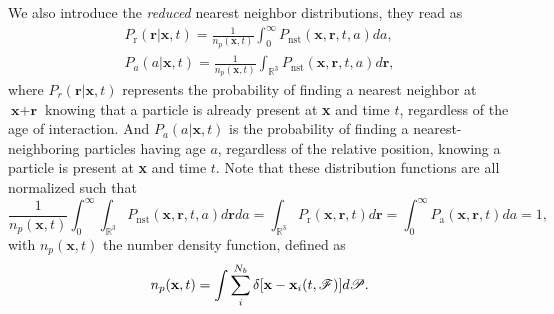 We also introduce the \textit{reduced} nearest neighbor distributions, they read as
\begin{align}
    P_\text{r}(\textbf{r}|\textbf{x},t)
    =\frac{1}{n_p(\textbf{x},t)}\int_0^\infty P_\text{nst}(\textbf{x},\textbf{r},t,a) da,\\
    P_a(a|\textbf{x},t)
    = \frac{1}{n_p(\textbf{x},t)}\int_{\mathbb{R}^3} P_\text{nst}(\textbf{x},\textbf{r},t,a) d\textbf{r},
\end{align}
where $P_r(\textbf{r}|\textbf{x},t)$ represents the probability of finding a nearest neighbor at $\textbf{x}+\textbf{r}$ knowing that a particle is already present at \textbf{x} and time $t$, regardless of the age of interaction. 
And $P_a(a|\textbf{x},t)$ is the probability of finding  a nearest-neighboring particles having age $a$, regardless of the relative position, knowing a particle is present at \textbf{x} and time $t$. 
Note that these distribution functions are all normalized such that 
\begin{equation}
    \frac{1}{n_p(\textbf{x},t)}\int_0^\infty \int_{\mathbb{R}^3} P_\text{nst}(\textbf{x},\textbf{r},t,a) d\textbf{r} da 
    = 
    \int_{\mathbb{R}^3} P_\text{r}(\textbf{x},\textbf{r},t) d\textbf{r} 
    = \int_0^\infty P_\text{a}(\textbf{x},\textbf{r},t) da 
    = 1,
    \label{eq:norm}
\end{equation}
with $n_p(\textbf{x},t)$ the number density function, defined as
\begin{equation}
    n_p(\textbf{x},t)= 
    \int \sum_{i}^{N_b}\delta[\textbf{x}-\textbf{x}_i(t,\mathscr{F})] d\mathscr{P}.
    \label{eq:n_p}
\end{equation}


